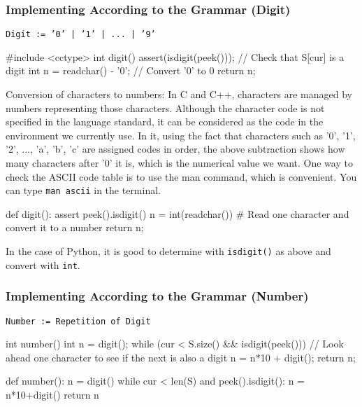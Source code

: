 \subsubsection{Implementing According to the Grammar (Digit)}
\texttt{\textcolor{ired}{Digit := '0' | '1' | ... | '9'}}

\begin{cbox}[emph={digit,peek,readchar}]
#include <cctype>
int digit() {
  assert(isdigit(peek()));  // Check that S[cur] is a digit
  int n = readchar() - '0'; // Convert '0' to 0
  return n;
}
\end{cbox}
Conversion of characters to numbers: In C and C++, characters are managed by numbers representing those characters. Although the character code is not specified in the language standard, it can be considered as the  code in the environment we currently use. In it, using the fact that characters such as '0', '1', '2', ..., 'a', 'b', 'c' are assigned codes in order, the above subtraction shows how many characters after '0' it is, which is the numerical value we want. One way to check the ASCII code table is to use the man command, which is convenient. You can type \texttt{man ascii} in the terminal.

\begin{pybox}
def digit():
  assert peek().isdigit()
  n = int(readchar()) # Read one character and convert it to a number
  return n;
\end{pybox}

In the case of Python, it is good to determine with \texttt{isdigit()} as above and convert with \texttt{int}.

\subsubsection{Implementing According to the Grammar (Number)}
\texttt{\textcolor{ired}{Number := Repetition of Digit}}

\begin{cbox}[emph={number},emph={[2]digit}]
int number() {
  int n = digit();
  while (cur < S.size() && isdigit(peek())) // Look ahead one character to see if the next is also a digit
    n = n*10 + digit(); 
  return n;
}
\end{cbox}

\begin{pybox}[emph={number},emph={[2]digit}]
def number():
    n = digit()
    while cur < len(S) and peek().isdigit():
        n = n*10+digit()
    return n  
\end{pybox}

